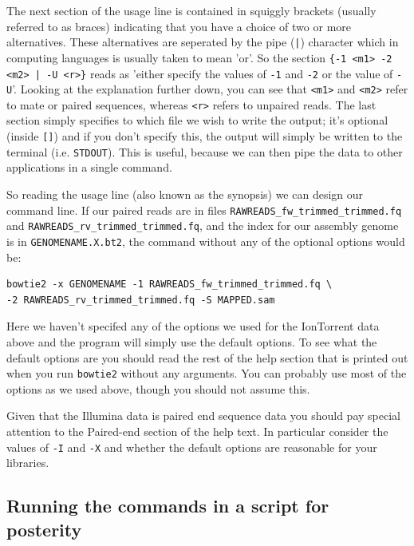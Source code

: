 \documentclass[11pt]{article}
\begin{document}
The next section of the usage line is contained in squiggly brackets (usually
referred to as braces) indicating that you have a choice of two or more
alternatives. These alternatives are seperated by the pipe (\texttt{|}) character
which in computing languages is usually taken to mean 'or'. So the section 
\texttt{\{-1 <m1> -2 <m2> | -U <r>\}} reads as 'either specify the values of \texttt{-1} and
\texttt{-2} or the value of \texttt{-U}'. Looking at the explanation further down, you can
see that \texttt{<m1>} and \texttt{<m2>} refer to mate or paired sequences, whereas \texttt{<r>}
refers to unpaired reads. The last section simply specifies to which file we
wish to write the output; it's optional (inside \texttt{[]}) and if you don't specify this, 
the output will simply be
written to the terminal (i.e. \texttt{STDOUT}). This is useful, because we can then
pipe the data to other applications in a single command.

So reading the usage line (also known as the synopsis) we can design our
command line. If our paired reads are in files
\texttt{RAWREADS\_fw\_trimmed\_trimmed.fq} and 
\texttt{RAWREADS\_rv\_trimmed\_trimmed.fq}, and the index for our assembly genome is in 
\texttt{GENOMENAME.X.bt2}, the command without any of the optional options would be:

\begin{verbatim}
bowtie2 -x GENOMENAME -1 RAWREADS_fw_trimmed_trimmed.fq \
-2 RAWREADS_rv_trimmed_trimmed.fq -S MAPPED.sam
\end{verbatim}

Here we haven't specifed any of the options we used for the IonTorrent data
above and the program will simply use the default options. To see what the
default options are you should read the rest of the help section that is
printed out when you run \texttt{bowtie2} without any arguments. You can probably
use most of the options as we used above, though you should not assume this.

Given that the Illumina data is paired end sequence data you should pay
special attention to the Paired-end section of the help text. In particular
consider the values of \texttt{-I} and \texttt{-X} and whether the default options are
reasonable for your libraries.

\subsection{Running the commands in a script for posterity}
\label{sec:orgheadline2}
\end{document}

